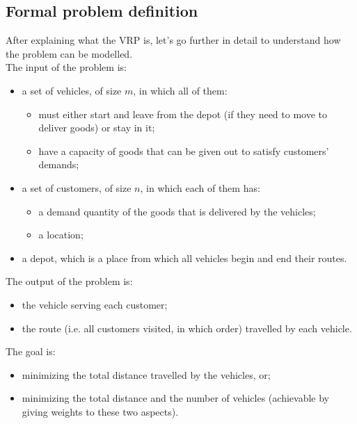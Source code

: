 \documentclass[../main.tex]{subfiles}
\begin{document}
\subsection{Formal problem definition}
After explaining what the VRP is, let's go further in detail to understand how the problem can be modelled.\\
The input of the problem is:
\begin{itemize}
    \item a set of vehicles, of size $m$, in which all of them:
    \begin{itemize}
        \item must either start and leave from the depot (if they need to move to deliver goods) or stay in it;
        \item have a capacity of goods that can be given out to satisfy customers' demands;
    \end{itemize}
    \item a set of customers, of size $n$, in which each of them has:
    \begin{itemize}
        \item a demand quantity of the goods that is delivered by the vehicles;
        \item a location;
    \end{itemize}
    \item a depot, which is a place from which all vehicles begin and end their routes.
\end{itemize}
The output of the problem is:
\begin{itemize}
    \item the vehicle serving each customer;
    \item the route (i.e. all customers visited, in which order) travelled by each vehicle.
\end{itemize}
The goal is:
\begin{itemize}
    \item minimizing the total distance travelled by the vehicles, or;
    \item minimizing the total distance and the number of vehicles (achievable by giving weights to these two aspects).
\end{itemize}
\end{document}

